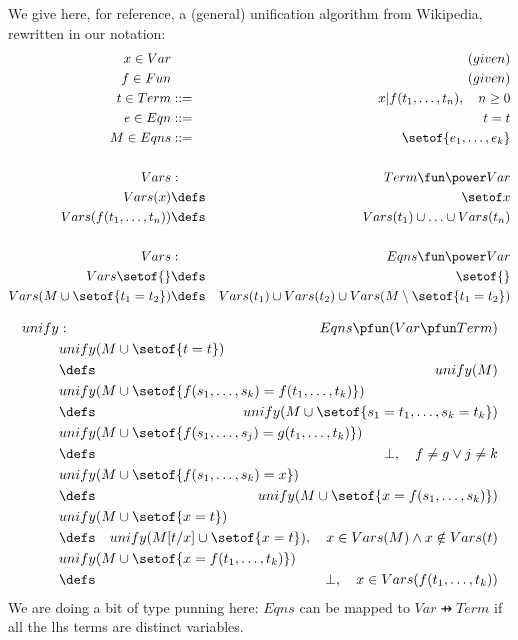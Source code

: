 We give here, for reference, a (general) unification algorithm from Wikipedia,
rewritten in our notation:
\begin{eqnarray*}
   x \in Var   && (given)
\\ f \in Fun      && (given)
\\ t \in Term     &::=&  x | f(t_1,\ldots,t_n), \quad n \geq 0
\\ e \in Eqn      &::=&  t = t
\\ M \in Eqns     &::=& \setof{e_1,\ldots,e_k}
\\
\\ Vars &:& Term \fun \power Var
\\ Vars(x) &\defs& \setof x
\\ Vars(f(t_1,\ldots,t_n)) &\defs& Vars(t_1) \cup \ldots \cup Vars(t_n)
\\
\\ Vars &:& Eqns \fun \power Var
\\ Vars\setof{} &\defs& \setof{}
\\ Vars(M \cup \setof{t_1=t_2}) 
  &\defs& 
  Vars(t_1) \cup Vars(t_2) \cup Vars(M \setminus \setof{t_1=t_2})
\end{eqnarray*}

\begin{eqnarray*}
   unify &:& Eqns \pfun (Var \pfun Term)
\\ \lefteqn{unify(M\cup\setof{t=t})}
\\ &\defs& unify(M)
\\ \lefteqn{unify(M\cup \setof{f(s_1,\ldots,s_k)=f(t_1,\ldots,t_k)} )}
\\ &\defs& unify(M\cup\setof{s_1=t_1,\ldots,s_k=t_k})
\\ \lefteqn{ unify(M\cup \setof{f(s_1,\ldots,s_j)=g(t_1,\ldots,t_k)} )}
\\ &\defs& \bot, 
   \quad f \neq g \lor j \neq k
\\ \lefteqn{ unify(M\cup \setof{f(s_1,\ldots,s_k)=x} )}
\\ &\defs& unify(M\cup\setof{x=f(s_1,\ldots,s_k)})
\\ \lefteqn{ unify(M\cup \setof{x=t} )}
\\ &\defs& unify(M[t/x] \cup \setof{x=t}), 
   \quad x \in Vars(M) \land x \notin Vars(t)
\\ \lefteqn{ unify(M\cup \setof{x=f(t_1,\ldots,t_k)} )}
\\ &\defs& \bot,
   \quad x \in Vars(f(t_1,\ldots,t_k))
\end{eqnarray*}
We are doing a bit of type punning here: $Eqns$ can be mapped to $Var \pfun Term$
if all the lhs terms are distinct variables.